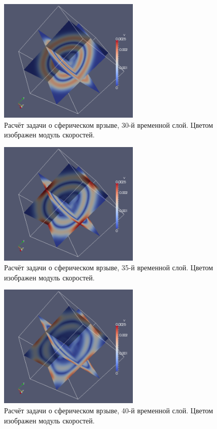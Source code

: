 \begin{figure}[htp]
\centering
\includegraphics[width=0.6\textwidth]{png/spherical-explosion-test/v-scalar/0030.png}
\caption{Расчёт задачи о сферическом врзыве, 30-й временной слой. Цветом изображен модуль скоростей.}
\end{figure}

\begin{figure}[htp]
\centering
\includegraphics[width=0.6\textwidth]{png/spherical-explosion-test/v-scalar/0035.png}
\caption{Расчёт задачи о сферическом врзыве, 35-й временной слой. Цветом изображен модуль скоростей.}
\end{figure}

\begin{figure}[htp]
\centering
\includegraphics[width=0.6\textwidth]{png/spherical-explosion-test/v-scalar/0040.png}
\caption{Расчёт задачи о сферическом врзыве, 40-й временной слой. Цветом изображен модуль скоростей.}
\end{figure}

